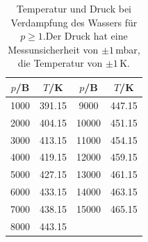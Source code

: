   \begin{table}[H]
    \centering
    \caption{Temperatur und Druck bei Verdampfung des Wassers für $p\geq 1$.Der Druck hat eine Messunsicherheit von
    $\pm1$\,mbar, die Temperatur von $\pm 1$\,K.}
    \label{tab:Messreihe_2}
  \begin{tabular}{
    c c||c c
  }
  \toprule 
  $p$/B & $T$/K & $p$/B & $T$/K\\
  \midrule
  1000  & 391.15 & 9000  & 447.15\\
  2000  & 404.15 & 10000 & 451.15\\
  3000  & 413.15 & 11000 & 454.15\\
  4000  & 419.15 & 12000 & 459.15\\
  5000  & 427.15 & 13000 & 461.15\\
  6000  & 433.15 & 14000 & 463.15\\
  7000  & 438.15 & 15000 & 465.15\\
  8000  & 443.15 &       &      \\
  \bottomrule
  \end{tabular}
  \end{table}
